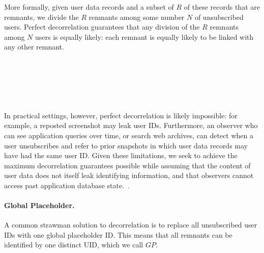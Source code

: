 More formally, given user data records and a subset of $R$ of these records that are remnants, we
divide the $R$ remnants among some number $N$ of unsubscribed users.  Perfect decorrelation
guarantees that any division of the $R$ remnants among $N$ users is equally likely: each remnant is
equally likely to be linked with any other remnant. 

~ 

~

~

In practical settings, however, perfect decorrelation is likely impossible: for example, a reposted
screenshot may leak user IDs. Furthermore, an observer who can see application queries over time, or
search web archives, can detect when a user unsubscribes and refer to prior snapshots in which user
data records may have had the same user ID.  Given these limitations, we seek to achieve the maximum
decorrelation guarantees possible while assuming that the content of user data does not itself leak
identifying information, and that observers cannot access past application database
state.~.

\paragraph{Global Placeholder.}
A common strawman solution to decorrelation is to replace all unsubscribed user IDs with one global
placeholder ID. This means that all remnants can be identified by one distinct UID, which we call
$GP$.

